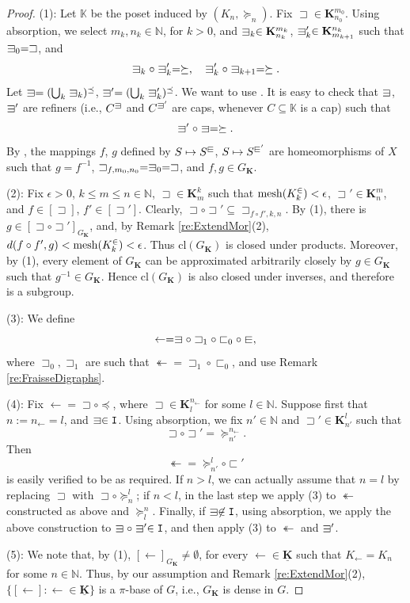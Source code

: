 \documentclass[12pt]{amsart}
\numberwithin{equation}{section}
\theoremstyle{plain}
\theoremstyle{definition}
\newcommand{\sqni}{\mathrel{\vphantom{\sqsupset}\text{\mathsurround=0pt\ooalign{$\sqsupset$\cr$-$\cr}}}}
\newcommand{\sqin}{\mathrel{\vphantom{\sqsubset}\text{\mathsurround=0pt\ooalign{$\sqsubset$\cr$-$\cr}}}}
\newcommand \mesh{{\rm{ mesh}}}
\newcommand \sqsp{\sqsupset}
\newcommand \sqsb{\sqsubset}
\newcommand \la{\leftarrow}
\newcommand \tla{\twoheadleftarrow}
\newcommand{\cl}{\mbox{cl}}
\newcommand \KKb{\mathbf{K}}
\newcommand \KKub{\underline{\mathbf{K}}}
\newcommand \KK{\mathbb{K}}
\newcommand \NN{\mathbb{N}}
\newcommand \It{\mathtt{I}}
\begin{document}
\begin{proof}
(1): Let $\KK$ be the poset  induced by $(K_n, \succeq_n)$. Fix $\sqsp \in \KKb^{m_0}_{n_0}$.  Using absorption, we select $m_k, n_k \in \NN$, for $k>0$, and $\sqni_k \in \KKb^{m_k}_{n_k}$, $\sqni'_k \in \KKb^{n_k}_{m_{k+1}}$ such that $\sqni_0=\sqsp$, and $$\sqni_k \circ \sqni'_{k}=\succeq, \quad \sqni'_k \circ \sqni_{k+1}=\succeq.$$
%
Let $\sqni=(\bigcup_k \sqni_k)^\preceq$, $\sqni'=(\bigcup_k \sqni'_k)^\preceq$. We want to use \cite[Proposition 3.7]{BaBiVi}. It is easy to check that $\sqni$, $\sqni'$ are refiners (i.e., $C^{\sqni}$ and $C^{\sqni'}$ are caps, whenever $C \subseteq \KK$ is a cap) such that $$\sqni' \circ \sqni=\succeq.$$ By \cite[Proposition 3.7]{BaBiVi}, the mappings $f$, $g$ defined by $S \mapsto S^{\sqin}$, $S \mapsto S^{\sqin'}$ are homeomorphisms of $X$ such that $g=f^{-1}$, $\sqsp_{f,m_0,n_0}=\sqni_0=\sqsp$, and $f,g \in G_\KKb$. %
 
(2): Fix $\epsilon>0$, $k \leq m \leq n \in \NN$, $\sqsp \in \KKb^k_m$ such that $\mesh(K^\in_k)<\epsilon$, $\sqsp' \in \KKb^m_n$, and $f \in [\sqsp]$, $f' \in [\sqsp']$. Clearly, $\sqsp \circ \sqsp' \subseteq \sqsp_{f \circ f',k,n}$. By (1), there is $g \in [\sqsp \circ \sqsp']_{G_\KKb}$, and, by Remark \ref{re:ExtendMor}(2), $d(f \circ f',g)<\mesh(K^\in_k)<\epsilon$. Thus $\cl(G_\KKb)$ is closed under products. Moreover, by (1), every element of $G_\KKb$ can be approximated arbitrarily closely
by $g\in G_\KKb$ such that $g^{-1}\in G_\KKb$. Hence $\cl(G_\KKb)$ is also closed under inverses, and therefore is a subgroup.

(3): We define $$\la=\sqni \circ \sqsp_1 \circ \sqsb_0 \circ \sqin,$$ where $\sqsp_0,  \sqsp_1$ are such that $\tla=\sqsp_1 \circ \sqsb_0$, and use Remark \ref{re:FraisseDigraphs}.

(4): Fix $\la=\sqsp \circ \preceq$, where $\sqsp \in \KKb_l^{n_\la}$ for some $l \in \NN$. Suppose first that $n:=n_\la=l$, and $\sqni \in \It$. Using absorption, we fix $n' \in \NN$ and $\sqsp' \in \KKb^l_{n'}$ such that $$\sqsp \circ \sqsp'= \succeq^{n_\la}_{n'}.$$ Then $$\twoheadleftarrow=\succeq^{l}_{n'} \circ \sqsb'$$ is easily verified to be as required. If $n>l$, we can actually assume that $n=l$ by replacing $\sqsp$ with $\sqsp \circ \succeq^l_{n}$; if $n<l$, in the last step we apply (3) to $\tla$ constructed as above and $\succeq^{n}_l$. Finally, if $\sqni \not \in \It$, using absorption, we apply the above construction to $\sqni \circ \sqni' \in \It$, and then apply (3) to $\tla$ and $\sqni'$.  

(5): We note that, by (1), $[\la]_{G_\KKb} \neq \emptyset$, for every $\la \in \KKub$ such that $K_\la=K_n$ for some $n \in \NN$.  Thus, by our assumption and Remark \ref{re:ExtendMor}(2), $\{[\la]: \la \in \KKub \}$ is a $\pi$-base of $G$, i.e., $G_\KKb$ is dense in $G$.
\end{proof}
\end{document}
